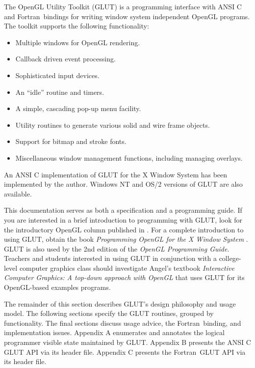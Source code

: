 \documentclass[titlepage,twoside]{article}
\begin{document}
\def\Fortran{{\sc Fortran}}

The OpenGL Utility Toolkit (GLUT) is a programming interface with ANSI C and
\Fortran\ bindings for writing window system
independent OpenGL programs.  The toolkit supports the following functionality:
\begin{itemize}
\item Multiple windows for OpenGL rendering.
\item Callback driven event processing.
\item Sophisticated input devices.
\item An ``idle'' routine and timers.
\item A simple, cascading pop-up menu facility.
\item Utility routines to generate various solid and wire frame objects.
\item Support for bitmap and stroke fonts.
\item Miscellaneous window management functions, including managing overlays.
\end{itemize}
An ANSI C implementation of GLUT for the X Window System \cite{x92} has
been implemented by the author.  Windows NT and OS/2 versions of GLUT
are also available.

This documentation serves as both a specification and a programming guide.
If you are interested in a brief introduction to programming with GLUT,
look for the introductory OpenGL column \cite{kilgard94c}
published in .  For a complete
introduction to using GLUT, obtain the book {\em Programming OpenGL
for the X Window System} \cite{kilgard96}.  GLUT is also used by the
2nd edition of the {\em OpenGL Programming Guide}.
Teachers and students
interested in using GLUT in conjunction with a college-level computer
graphics class should investigate Angel's textbook
{\em Interactive Computer Graphics:
A top-down approach with OpenGL} \cite{angel96} that uses GLUT
for its OpenGL-based examples programs.

The remainder of this section describes GLUT's design philosophy and
usage model.  The following sections specify the GLUT routines, grouped
by functionality.  The final sections discuss usage advice, the
\Fortran\ binding, and implementation issues.  Appendix A enumerates
and annotates the logical programmer visible state maintained by GLUT.
Appendix B presents the ANSI C GLUT API via its header file.  Appendix
C presents the \Fortran\ GLUT API via its header file.
\end{document}
